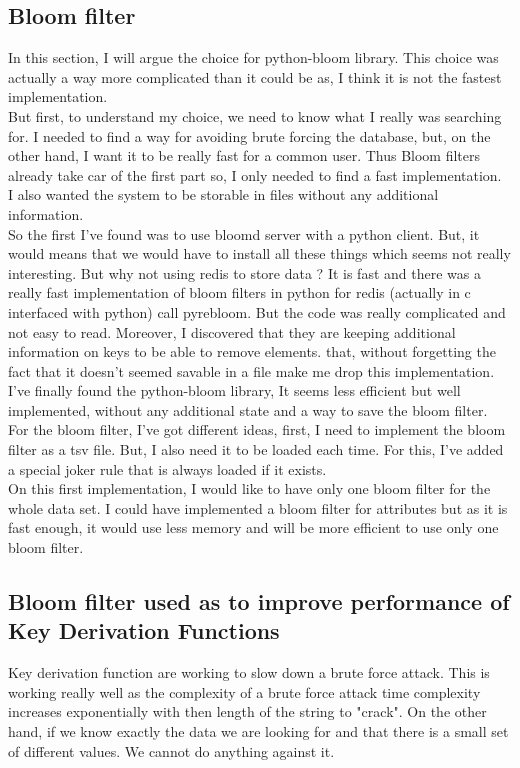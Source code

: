 \documentclass{eplmastersthesis}
\begin{document}
\subsection{Bloom filter}
In this section, I will argue the choice for python-bloom library. This choice was actually a way more complicated than it could be as, I think it is not the fastest implementation.\\
But first, to understand my choice, we need to know what I really was searching for. I needed to find a way for avoiding brute forcing the database, but, on the other hand, I want it to be really fast for a common user. Thus Bloom filters already take car of the first part so, I only needed to find a fast implementation.\\
I also wanted the system to be storable in files without any additional information.\\
So the first I've found was to use bloomd server with a python client. But, it would means that we would have to install all these things which seems not really interesting. But why not using redis to store data ? It is fast and there was a really fast implementation of bloom filters in python for redis (actually in c interfaced with python) call pyrebloom. But the code was really complicated and not easy to read. Moreover, I discovered that they are keeping additional information on keys to be able to remove elements. that, without forgetting the fact that it doesn't seemed savable in a file make me drop this implementation.\\
I've finally found the python-bloom library, It seems less efficient but well implemented, without any additional state and a way to save the bloom filter.\\

For the bloom filter, I've got different ideas, first, I need to implement the bloom filter as a tsv file. But, I also need it to be loaded each time. For this, I've added a special joker rule that is always loaded if it exists.\\
On this first implementation, I would like to have only one bloom filter for the whole data set. I could have implemented a bloom filter for attributes but as it is fast enough, it would use less memory and will be more efficient to use only one bloom filter.\\



\subsection{Bloom filter used as to improve performance of Key Derivation Functions}
Key derivation function are working to slow down a brute force attack. This is working really well as the complexity of a brute force attack time complexity increases exponentially with then length of the string to "crack". On the other hand, if we know exactly the data we are looking for and that there is a small set of different values. We cannot do anything against it. \\
\end{document}
